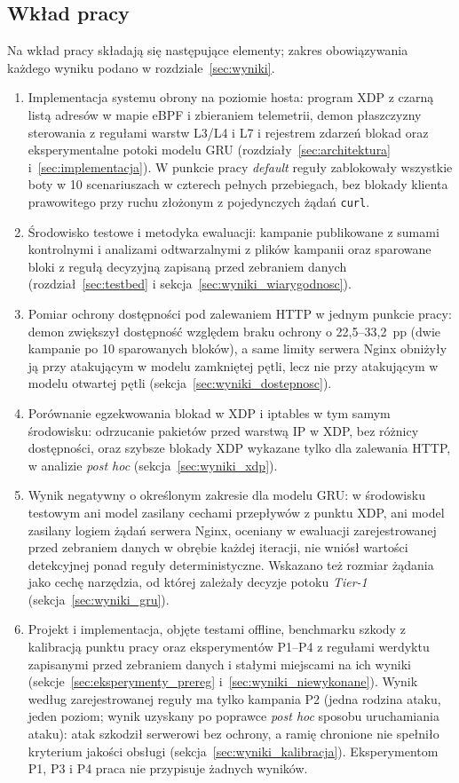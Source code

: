 \documentclass[a4paper,12pt]{article}
\begin{document}
\subsection{Wkład pracy}
Na wkład pracy składają się następujące elementy; zakres obowiązywania każdego wyniku podano w rozdziale~\ref{sec:wyniki}.
\begin{enumerate}
    \item Implementacja systemu obrony na poziomie hosta: program XDP z czarną listą adresów w mapie eBPF i zbieraniem telemetrii, demon płaszczyzny sterowania z regułami warstw L3/L4 i L7 i rejestrem zdarzeń blokad oraz eksperymentalne potoki modelu GRU (rozdziały~\ref{sec:architektura} i~\ref{sec:implementacja}). W punkcie pracy \textit{default} reguły zablokowały wszystkie boty w 10 scenariuszach w czterech pełnych przebiegach, bez blokady klienta prawowitego przy ruchu złożonym z pojedynczych żądań \texttt{curl}.
    \item Środowisko testowe i metodyka ewaluacji: kampanie publikowane z sumami kontrolnymi i analizami odtwarzalnymi z plików kampanii oraz sparowane bloki z regułą decyzyjną zapisaną przed zebraniem danych (rozdział~\ref{sec:testbed} i sekcja~\ref{sec:wyniki_wiarygodnosc}).
    \item Pomiar ochrony dostępności pod zalewaniem HTTP w jednym punkcie pracy: demon zwiększył dostępność względem braku ochrony o 22,5--33,2~pp (dwie kampanie po 10 sparowanych bloków), a same limity serwera Nginx obniżyły ją przy atakującym w modelu zamkniętej pętli, lecz nie przy atakującym w modelu otwartej pętli (sekcja~\ref{sec:wyniki_dostepnosc}).
    \item Porównanie egzekwowania blokad w XDP i iptables w tym samym środowisku: odrzucanie pakietów przed warstwą IP w XDP, bez różnicy dostępności, oraz szybsze blokady XDP wykazane tylko dla zalewania HTTP, w analizie \textit{post hoc} (sekcja~\ref{sec:wyniki_xdp}).
    \item Wynik negatywny o określonym zakresie dla modelu GRU: w środowisku testowym ani model zasilany cechami przepływów z punktu XDP, ani model zasilany logiem żądań serwera Nginx, oceniany w ewaluacji zarejestrowanej przed zebraniem danych w obrębie każdej iteracji, nie wniósł wartości detekcyjnej ponad reguły deterministyczne. Wskazano też rozmiar żądania jako cechę narzędzia, od której zależały decyzje potoku \textit{Tier-1} (sekcja~\ref{sec:wyniki_gru}).
    \item Projekt i implementacja, objęte testami offline, benchmarku szkody z kalibracją punktu pracy oraz eksperymentów P1--P4 z regułami werdyktu zapisanymi przed zebraniem danych i stałymi miejscami na ich wyniki (sekcje~\ref{sec:eksperymenty_prereg} i~\ref{sec:wyniki_niewykonane}). Wynik według zarejestrowanej reguły ma tylko kampania P2 (jedna rodzina ataku, jeden poziom; wynik uzyskany po poprawce \textit{post hoc} sposobu uruchamiania ataku): atak szkodził serwerowi bez ochrony, a ramię chronione nie spełniło kryterium jakości obsługi (sekcja~\ref{sec:wyniki_kalibracja}). Eksperymentom P1, P3 i P4 praca nie przypisuje żadnych wyników.
\end{enumerate}
\end{document}
